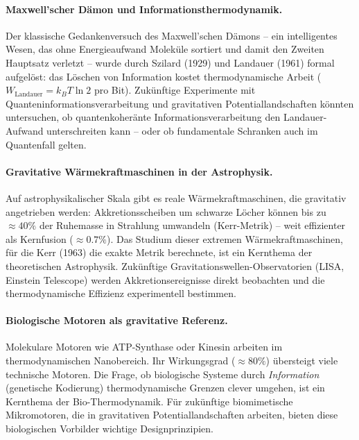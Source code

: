 ﻿\documentclass[12pt, a4paper]{report}
\theoremstyle{definition}
\theoremstyle{remark}
\begin{document}
\paragraph{Maxwell'scher Dämon und Informationsthermodynamik.}
Der klassische Gedankenversuch des Maxwell'schen Dämons -- ein intelligentes
Wesen, das ohne Energieaufwand Moleküle sortiert und damit den Zweiten Hauptsatz
verletzt -- wurde durch Szilard (1929) und Landauer (1961) formal aufgelöst:
das Löschen von Information kostet thermodynamische Arbeit
($W_{\text{Landauer}} = k_B T \ln 2$ pro Bit). Zukünftige Experimente mit
Quanteninformationsverarbeitung und gravitativen Potentiallandschaften könnten
untersuchen, ob quantenkoheränte Informationsverarbeitung den Landauer-Aufwand
unterschreiten kann -- oder ob fundamentale Schranken auch im Quantenfall gelten.

\paragraph{Gravitative Wärmekraftmaschinen in der Astrophysik.}
Auf astrophysikalischer Skala gibt es reale Wärmekraftmaschinen, die gravitativ
angetrieben werden: Akkretionsscheiben um schwarze Löcher können bis zu
$\approx 40\%$ der Ruhemasse in Strahlung umwandeln (Kerr-Metrik) -- weit
effizienter als Kernfusion ($\approx 0.7\%$). Das Studium dieser extremen
Wärmekraftmaschinen, für die Kerr (1963) die exakte Metrik berechnete, ist ein
Kernthema der theoretischen Astrophysik. Zukünftige Gravitationswellen-Observatorien
(LISA, Einstein Telescope) werden Akkretionsereignisse direkt beobachten und
die thermodynamische Effizienz experimentell bestimmen.

\paragraph{Biologische Motoren als gravitative Referenz.}
Molekulare Motoren wie ATP-Synthase oder Kinesin arbeiten im thermodynamischen
Nanobereich. Ihr Wirkungsgrad ($\approx 80\%$) übersteigt viele technische
Motoren. Die Frage, ob biologische Systeme durch \emph{Information} (genetische
Kodierung) thermodynamische Grenzen clever umgehen, ist ein Kernthema der
Bio-Thermodynamik. Für zukünftige biomimetische Mikromotoren, die in gravitativen
Potentiallandschaften arbeiten, bieten diese biologischen Vorbilder wichtige
Designprinzipien.

\end{document}

